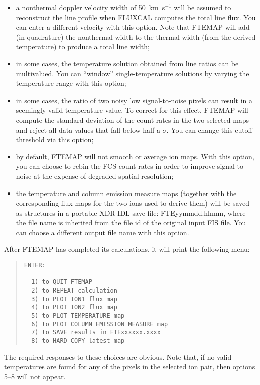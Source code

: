 {{{\begin{itemize}
\item a nonthermal doppler velocity width of 50~km~s$^{-1}$ will be 
assumed to reconstruct the line profile when FLUXCAL computes the total line
flux. You can enter a different velocity with this option. Note that FTEMAP
will add (in quadrature) the nonthermal width to the thermal  width (from the
derived temperature) to produce a total line width;

\item in some cases, the temperature solution obtained from line ratios
can be multivalued. You can ``window'' single-temperature solutions by varying
the temperature range with this option;

\item in some cases, the ratio of two noisy low signal-to-noise pixels can
result in a seemingly valid temperature value. To correct for this effect,
FTEMAP will compute the standard deviation of the count rates in the two
selected maps and reject all data values that fall below half a $\sigma$. You
can change this cutoff threshold via this option;

\item by default, FTEMAP will not smooth or average ion maps. With this
option, you can choose to rebin the FCS count rates in order to improve
signal-to-noise at the expense of degraded spatial resolution;

\item the temperature and column emission measure maps (together with the
corresponding flux maps for the two ions used  to derive them) will be saved as
structures in a portable XDR IDL save file: FTEyymmdd.hhmm, where the file name
is inherited from the file id of the original input FIS file. You can choose a
different output file name with this option.
\end{itemize}

After FTEMAP has completed its calculations, it will print the following menu:
\begin{quote}
\begin{verbatim}
ENTER:

  1) to QUIT FTEMAP
  2) to REPEAT calculation
  3) to PLOT ION1 flux map
  4) to PLOT ION2 flux map
  5) to PLOT TEMPERATURE map
  6) to PLOT COLUMN EMISSION MEASURE map
  7) to SAVE results in FTExxxxxx.xxxx
  8) to HARD COPY latest map
\end{verbatim}
\end{quote}
The required responses to these choices are obvious. Note that, if no valid
temperatures are found for any of the pixels in the selected ion pair, then
options 5--8 will not appear.

}}}
